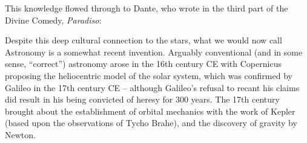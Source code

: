 This knowledge flowed through to Dante, who wrote in the third part of the Divine Comedy, \textit{Paradiso}:






Despite this deep cultural connection to the stars, what we would now call Astronomy is a somewhat recent invention. Arguably conventional (and in some sense, ``correct'') astronomy arose in the 16th century CE with Copernicus proposing the heliocentric model of the solar system, which was confirmed by Galileo in the 17th century CE \citep{Carroll:2017} -- although Galileo's refusal to recant his claims did result in his being convicted of heresy for 300 years. The 17th century brought about the establishment of orbital mechanics with the work of Kepler (based upon the observations of Tycho Brahe), and the discovery of gravity by Newton.

